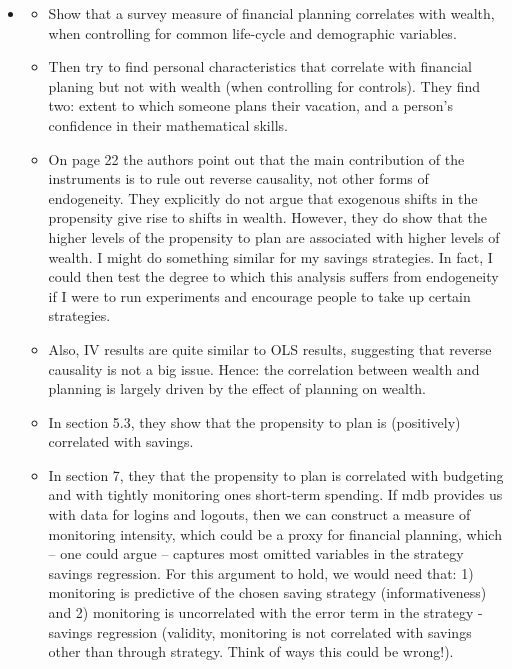 \documentclass[a4paper, 11pt]{report}
\begin{document}
\begin{itemize}
	\item \citet{ameriks2003wealth}
	\begin{itemize}
		\item Show that a survey measure of financial planning correlates with wealth, when controlling for common life-cycle and demographic variables.
		\item Then try to find personal characteristics that correlate with financial planing but not with wealth (when controlling for controls). They find two: extent to which someone plans their vacation, and a person's confidence in their mathematical skills.
		\item On page 22 the authors point out that the main contribution of the instruments is to rule out reverse causality, not other forms of endogeneity. They explicitly do not argue that exogenous shifts in the propensity give rise to shifts in wealth. However, they do show that the higher levels of the propensity to plan are associated with higher levels of wealth. I might do something similar for my savings strategies. In fact, I could then test the degree to which this analysis suffers from endogeneity if I were to run experiments and encourage people to take up certain strategies.
		\item Also, IV results are quite similar to OLS results, suggesting that reverse causality is not a big issue. Hence: the correlation between wealth and planning is largely driven by the effect of planning on wealth.
		\item In section 5.3, they show that the propensity to plan is (positively) correlated with savings.
		\item In section 7, they that the propensity to plan is correlated with budgeting and with tightly monitoring ones short-term spending. If mdb provides us with data for logins and logouts, then we can construct a measure of monitoring intensity, which could be a proxy for financial planning, which -- one could argue -- captures most omitted variables in the strategy savings regression. For this argument to hold, we would need that: 1) monitoring is predictive of the chosen saving strategy (informativeness) and 2) monitoring is uncorrelated with the error term in the strategy - savings regression (validity, monitoring is not correlated with savings other than through strategy. Think of ways this could be wrong!).
	\end{itemize}
\end{itemize}
\end{document}
